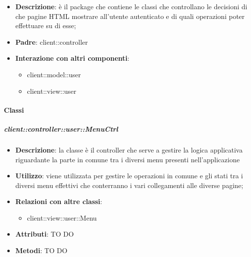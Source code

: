 \begin{itemize}
	\item \textbf{Descrizione}: è il package che contiene le classi che controllano le decisioni di che pagine HTML mostrare all'utente autenticato e di quali operazioni poter effettuare su di esse;
	\item \textbf{Padre}: client::controller
	\item \textbf{Interazione con altri componenti}:
		\begin{itemize}
			\item client::model::user
			\item client::view::user
		\end{itemize}
\end{itemize}

	\paragraph{Classi} %
		\subparagraph{client::controller::user::MenuCtrl} %
		\label{subp:client_controller_user_menuctrl}
			\begin{itemize}
				\item \textbf{Descrizione}: la classe è il controller che serve a gestire la logica applicativa riguardante la parte in comune tra i diversi menu presenti nell'applicazione
				\item \textbf{Utilizzo}: viene utilizzata per gestire le operazioni in comune e gli stati tra i diversi menu effettivi che conterranno i vari collegamenti alle diverse pagine;
				\item \textbf{Relazioni con altre classi}:
					\begin{itemize}
						\item client::view::user::Menu
					\end{itemize}
				\item \textbf{Attributi}: TO DO
				\item \textbf{Metodi}: TO DO
			\end{itemize}

